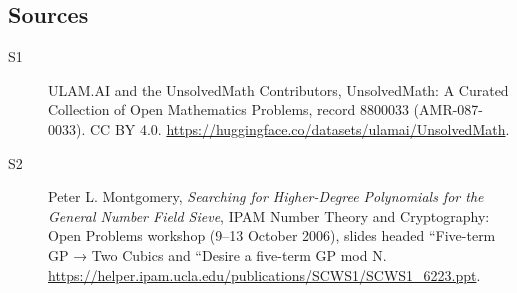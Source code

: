 \documentclass[11pt]{article}
\begin{document}
\subsection{Sources}
\begin{description}
\item[\hypertarget{source:8800033:1}{S1}] ULAM.AI and the UnsolvedMath Contributors, UnsolvedMath: A Curated Collection of Open Mathematics Problems, record 8800033 (AMR-087-0033). CC BY 4.0. \url{https://huggingface.co/datasets/ulamai/UnsolvedMath}.
\item[\hypertarget{source:8800033:2}{S2}] Peter L. Montgomery, \emph{Searching for Higher-Degree Polynomials for the General Number Field Sieve}, IPAM Number Theory and Cryptography: Open Problems workshop (9--13 October 2006), slides headed ``Five-term GP → Two Cubics and ``Desire a five-term GP mod N. \url{https://helper.ipam.ucla.edu/publications/SCWS1/SCWS1_6223.ppt}.
\end{description}
\label{end:8800033}
\end{document}
